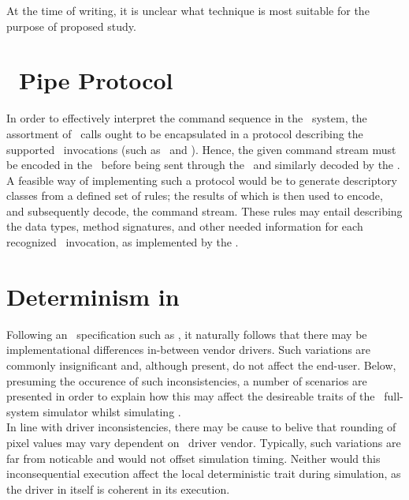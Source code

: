 At the time of writing, it is unclear what technique is most suitable for the purpose of proposed study.

\section*{\termsimics\ Pipe Protocol}
\label{sec:appendixa_simicspipeprotocol}

In order to effectively interpret the command sequence in the \termhost\ system, the assortment of \termapi\ calls ought to be encapsulated in a protocol describing the supported \termapi\ invocations (such as \termopengles\ and \termegl ).
Hence, the given command stream must be encoded in the \termguestsystemlibraries\ before being sent through the \termsimicspipe\ and similarly decoded by the \termhostrasterizationprocess .
A feasible way of implementing such a protocol would be to generate descriptory classes from a defined set of rules; the results of which is then used to encode, and subsequently decode, the command stream.
These rules may entail describing the data types, method signatures, and other needed information for each recognized \termapi\ invocation, as implemented by the \termrefsolu .

\section*{Determinism in \termopengles }
\label{sec:appendixa_determinisminopengles}

Following an \termapi\ specification such as \termopengles , it naturally follows that there may be implementational differences in-between vendor drivers.
Such variations are commonly insignificant and, although present, do not affect the end-user.
Below, presuming the occurence of such inconsistencies, a number of scenarios are presented in order to explain how this may affect the desireable traits of the \termsimics\ full-system simulator whilst simulating \termopengles .\\

\noindent
In line with driver inconsistencies, there may be cause to belive that rounding of pixel values may vary dependent on \termhost\ driver vendor.
Typically, such variations are far from noticable and would not offset simulation timing.
Neither would this inconsequential execution affect the local deterministic trait during simulation, as the driver in itself is coherent in its execution.

